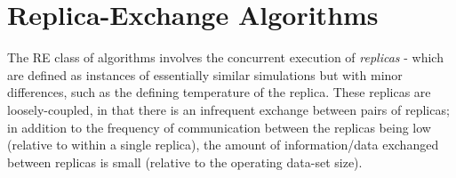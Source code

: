 \documentclass{rspublic}
\newcommand{\jhanote}[1]{ {\textcolor{red} { ***shantenu: #1 }}}
\newcommand{\alnote}[1]{ {\textcolor{blue} { ***andre: #1 }}}
\newcommand{\athotanote}[1]{ {\textcolor{green} { ***athota: #1 }}}
\newcommand{\alnote}[1]{}
\newcommand{\athotanote}[1]{}
\newcommand{\jhanote}[1]{}
\begin{document}



\section{Replica-Exchange Algorithms}\label{sec:repex-approach}

The RE class of algorithms involves the concurrent execution of
\emph{replicas} - which are defined as instances of essentially
similar simulations but with minor differences, such as the defining
temperature of the replica. These replicas are loosely-coupled, in
that there is an infrequent exchange between pairs of 
replicas; in addition to the frequency of communication between the
replicas being low (relative to within a single replica), the amount
of information/data exchanged between replicas is small (relative to
the operating data-set size).

\end{document}
